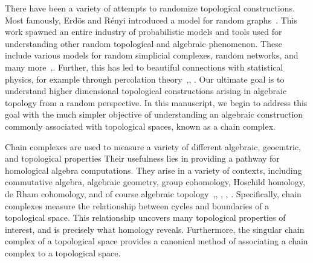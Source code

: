 There have been a variety of attempts to randomize topological constructions.
Most famously, Erd\"os and R\'enyi introduced a model for random
graphs~\cite{erdos_random_1959}.  This work spawned an
entire industry of probabilistic models and tools used for understanding other
random topological and algebraic phenomenon. These include various models for
random simplicial complexes, random networks, and many
more~\cite{erdos_evolution_1960},\cite{linial_random_2017}. Further, this has
led to beautiful connections with statistical physics, for example through
percolation theory~\cite{bollobas_2006_percolation},\cite{broadbent_percolation_1957},
\cite{kesten_percolation_1982}.  Our ultimate goal is to understand higher
dimensional topological constructions arising in algebraic topology from a
random perspective. In this manuscript, we begin to address this goal with the
much simpler objective of understanding an algebraic construction commonly associated
with topological spaces, known as a chain complex. 

Chain complexes are used to measure a
variety of different algebraic, geoemtric, and topological properties Their usefulness lies in
providing a pathway for homological algebra computations. They arise in a
variety of contexts, including commutative algebra, algebraic geometry, group
cohomology, Hoschild homology, de Rham cohomology, and of course algebraic
topology~\cite{bott2013differential},\cite{brown2012cohomology},
\cite{hartshorne2013algebraic}, \cite{hatcher2002algebraic}, \cite{hochschild1945cohomology}.
Specifically, chain complexes measure the relationship between cycles and
boundaries of a topological space. This relationship uncovers many topological
properties of interest, and is precisely what homology reveals. Furthermore,
the singular chain complex of a topological space provides a canonical method
of associating a chain complex to a topological space.


%


